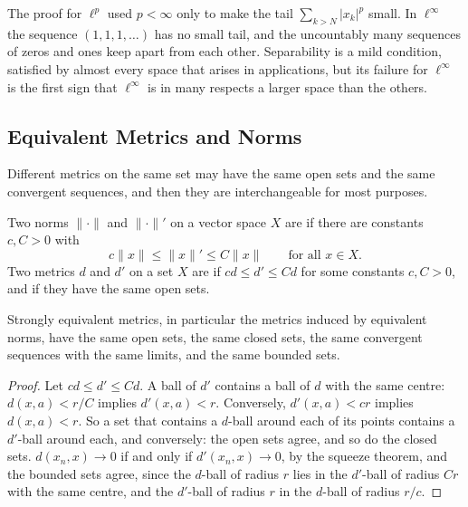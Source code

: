 The proof for $\ell^p$ used $p<\infty$ only to make the tail $\sum_{k>N}|x_k|^p$ small. In $\ell^\infty$ the sequence $(1,1,1,\ldots)$ has no small tail, and the uncountably many sequences of zeros and ones keep apart from each other. Separability is a mild condition, satisfied by almost every space that arises in applications, but its failure for $\ell^\infty$ is the first sign that $\ell^\infty$ is in many respects a larger space than the others.

\subsection{Equivalent Metrics and Norms}

Different metrics on the same set may have the same open sets and the same convergent sequences, and then they are interchangeable for most purposes.

\begin{definition}
\label{def:equivalent-norms}
Two norms $\|\cdot\|$ and $\|\cdot\|'$ on a vector space $X$ are  if there are constants $c,C>0$ with
\[
c\|x\|\le\|x\|'\le C\|x\|\qquad\text{for all }x\in X .
\]
Two metrics $d$ and $d'$ on a set $X$ are  if $cd\le d'\le Cd$ for some constants $c,C>0$, and  if they have the same open sets.
\end{definition}

\begin{proposition}
\label{prop:equivalent-norms}
Strongly equivalent metrics, in particular the metrics induced by equivalent norms, have the same open sets, the same closed sets, the same convergent sequences with the same limits, and the same bounded sets.
\end{proposition}

\begin{proof}
Let $cd\le d'\le Cd$. A ball of $d'$ contains a ball of $d$ with the same centre: $d(x,a)<r/C$ implies $d'(x,a)<r$. Conversely, $d'(x,a)<cr$ implies $d(x,a)<r$. So a set that contains a $d$-ball around each of its points contains a $d'$-ball around each, and conversely: the open sets agree, and so do the closed sets. $d(x_n,x)\to0$ if and only if $d'(x_n,x)\to0$, by the squeeze theorem, and the bounded sets agree, since the $d$-ball of radius $r$ lies in the $d'$-ball of radius $Cr$ with the same centre, and the $d'$-ball of radius $r$ in the $d$-ball of radius $r/c$.
\end{proof}

